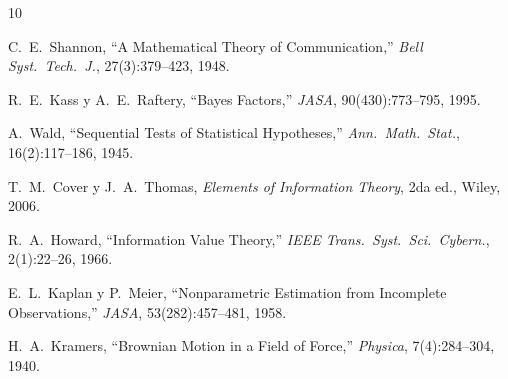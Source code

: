\documentclass[11pt,a4paper]{article}
\begin{document}
\begin{thebibliography}{10}

 C.~E.~Shannon, ``A Mathematical Theory of Communication,'' \textit{Bell Syst.\ Tech.\ J.}, 27(3):379--423, 1948.

 R.~E.~Kass y A.~E.~Raftery, ``Bayes Factors,'' \textit{JASA}, 90(430):773--795, 1995.

 A.~Wald, ``Sequential Tests of Statistical Hypotheses,'' \textit{Ann.\ Math.\ Stat.}, 16(2):117--186, 1945.

 T.~M.~Cover y J.~A.~Thomas, \textit{Elements of Information Theory}, 2da ed., Wiley, 2006.

 R.~A.~Howard, ``Information Value Theory,'' \textit{IEEE Trans.\ Syst.\ Sci.\ Cybern.}, 2(1):22--26, 1966.

 E.~L.~Kaplan y P.~Meier, ``Nonparametric Estimation from Incomplete Observations,'' \textit{JASA}, 53(282):457--481, 1958.

 H.~A.~Kramers, ``Brownian Motion in a Field of Force,'' \textit{Physica}, 7(4):284--304, 1940.

\end{thebibliography}
\end{document}
